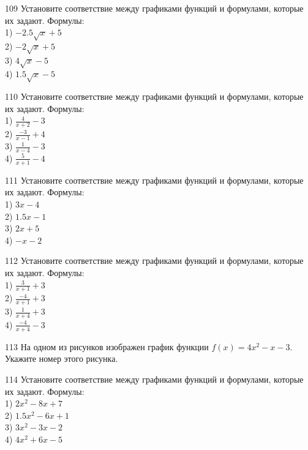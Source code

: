 \documentclass[4apaper]{article}
\begin{document}
\begin{taskBN}{109}
Установите соответствие между графиками функций и формулами, которые их задают. Формулы: \\1) $-2.5\sqrt{x}+5$\\2) $-2\sqrt{x}+5$\\3) $4\sqrt{x}-5$\\4) $1.5\sqrt{x}-5$
\end{taskBN}

\begin{taskBN}{110}
Установите соответствие между графиками функций и формулами, которые их задают. Формулы: \\1) $\frac{4}{x+2}-3$\\2) $\frac{-3}{x-1}+4$\\3) $\frac{1}{x-4}-3$\\4) $\frac{5}{x+1}-4$
\end{taskBN}

\begin{taskBN}{111}
Установите соответствие между графиками функций и формулами, которые их задают. Формулы: \\1) $3x-4$\\2) $1.5x-1$\\3) $2x+5$\\4) $-x-2$
\end{taskBN}

\begin{taskBN}{112}
Установите соответствие между графиками функций и формулами, которые их задают. Формулы: \\1) $\frac{3}{x+1}+3$\\2) $\frac{-4}{x+1}+3$\\3) $\frac{1}{x+4}+3$\\4) $\frac{-4}{x+4}-3$
\end{taskBN}

\begin{taskBN}{113}
На одном из рисунков изображен график функции $f(x)=4x^2-x-3$. Укажите номер этого рисунка.
\end{taskBN}

\begin{taskBN}{114}
Установите соответствие между графиками функций и формулами, которые их задают. Формулы: \\1) $2x^2-8x+7$\\2) $1.5x^2-6x+1$\\3) $3x^2-3x-2$\\4) $4x^2+6x-5$
\end{taskBN}
\end{document}
